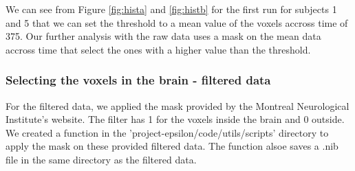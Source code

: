 \par We can see from Figure \ref{fig:hista} and \ref{fig:histb} for the first run for
subjects 1 and 5 that we can set the threshold to a mean value of the voxels accross
time of 375. Our further analysis with the raw data uses a mask on the mean data accross
time that select the ones with a higher value than the threshold.

\subsubsection{Selecting the voxels in the brain - filtered data}

\par For the filtered data, we applied the mask provided by the Montreal Neurological 
Institute's website. The filter has 1 for the voxels inside the brain and 0 outside.
We created a function in the 'project-epsilon/code/utils/scripts' directory to 
apply the mask on these provided filtered data. The function alsoe saves a .nib file in
the same directory as the filtered data.


